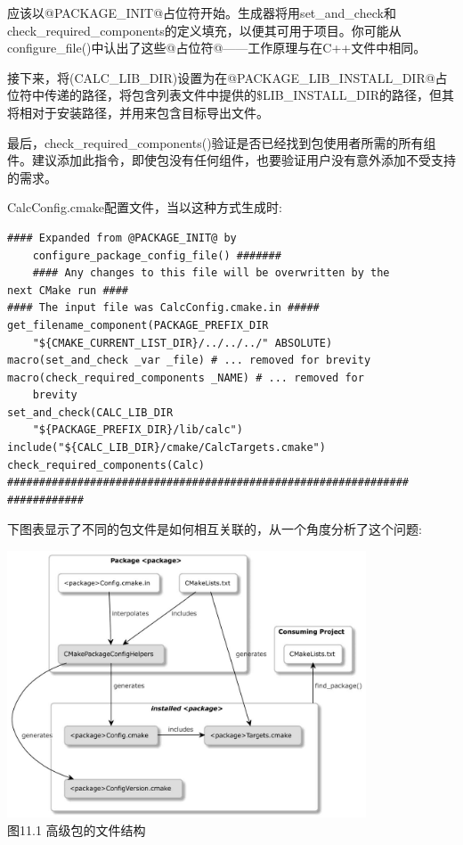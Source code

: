 应该以@PACKAGE\_INIT@占位符开始。生成器将用set\_and\_check和check\_required\_components的定义填充，以便其可用于项目。你可能从configure\_file()中认出了这些@占位符@——工作原理与在C++文件中相同。

接下来，将(CALC\_LIB\_DIR)设置为在@PACKAGE\_LIB\_INSTALL\_DIR@占位符中传递的路径，将包含列表文件中提供的\$LIB\_INSTALL\_DIR的路径，但其将相对于安装路径，并用来包含目标导出文件。

最后，check\_required\_components()验证是否已经找到包使用者所需的所有组件。建议添加此指令，即使包没有任何组件，也要验证用户没有意外添加不受支持的需求。

CalcConfig.cmake配置文件，当以这种方式生成时:

\begin{lstlisting}[style=styleCMake]
#### Expanded from @PACKAGE_INIT@ by
	configure_package_config_file() #######
	#### Any changes to this file will be overwritten by the
next CMake run ####
#### The input file was CalcConfig.cmake.in #####
get_filename_component(PACKAGE_PREFIX_DIR
	"${CMAKE_CURRENT_LIST_DIR}/../../../" ABSOLUTE)
macro(set_and_check _var _file) # ... removed for brevity
macro(check_required_components _NAME) # ... removed for
	brevity
set_and_check(CALC_LIB_DIR
	"${PACKAGE_PREFIX_DIR}/lib/calc")
include("${CALC_LIB_DIR}/cmake/CalcTargets.cmake")
check_required_components(Calc)
###############################################################
############
\end{lstlisting}

下图表显示了不同的包文件是如何相互关联的，从一个角度分析了这个问题:

\begin{center}
\includegraphics[width=0.8\textwidth]{content/3/chapter11/images/1.jpg}\\
图11.1 高级包的文件结构
\end{center}

